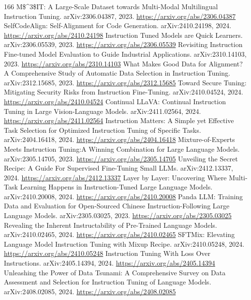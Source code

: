 \documentclass[11pt]{article}
\begin{document}
\begin{thebibliography}{166}
 M\$\textasciicircum{}3\$IT: A Large-Scale Dataset towards Multi-Modal Multilingual Instruction Tuning. arXiv:2306.04387, 2023. \url{https://arxiv.org/abs/2306.04387}
 SelfCodeAlign: Self-Alignment for Code Generation. arXiv:2410.24198, 2024. \url{https://arxiv.org/abs/2410.24198}
 Instruction Tuned Models are Quick Learners. arXiv:2306.05539, 2023. \url{https://arxiv.org/abs/2306.05539}
 Revisiting Instruction Fine-tuned Model Evaluation to Guide Industrial Applications. arXiv:2310.14103, 2023. \url{https://arxiv.org/abs/2310.14103}
 What Makes Good Data for Alignment? A Comprehensive Study of Automatic Data Selection in Instruction Tuning. arXiv:2312.15685, 2023. \url{https://arxiv.org/abs/2312.15685}
 Toward Secure Tuning: Mitigating Security Risks from Instruction Fine-Tuning. arXiv:2410.04524, 2024. \url{https://arxiv.org/abs/2410.04524}
 Continual LLaVA: Continual Instruction Tuning in Large Vision-Language Models. arXiv:2411.02564, 2024. \url{https://arxiv.org/abs/2411.02564}
 Instruction Matters: A Simple yet Effective Task Selection for Optimized Instruction Tuning of Specific Tasks. arXiv:2404.16418, 2024. \url{https://arxiv.org/abs/2404.16418}
 Mixture-of-Experts Meets Instruction Tuning:A Winning Combination for Large Language Models. arXiv:2305.14705, 2023. \url{https://arxiv.org/abs/2305.14705}
 Unveiling the Secret Recipe: A Guide For Supervised Fine-Tuning Small LLMs. arXiv:2412.13337, 2024. \url{https://arxiv.org/abs/2412.13337}
 Layer by Layer: Uncovering Where Multi-Task Learning Happens in Instruction-Tuned Large Language Models. arXiv:2410.20008, 2024. \url{https://arxiv.org/abs/2410.20008}
 Panda LLM: Training Data and Evaluation for Open-Sourced Chinese Instruction-Following Large Language Models. arXiv:2305.03025, 2023. \url{https://arxiv.org/abs/2305.03025}
 Revealing the Inherent Instructability of Pre-Trained Language Models. arXiv:2410.02465, 2024. \url{https://arxiv.org/abs/2410.02465}
 SFTMix: Elevating Language Model Instruction Tuning with Mixup Recipe. arXiv:2410.05248, 2024. \url{https://arxiv.org/abs/2410.05248}
 Instruction Tuning With Loss Over Instructions. arXiv:2405.14394, 2024. \url{https://arxiv.org/abs/2405.14394}
 Unleashing the Power of Data Tsunami: A Comprehensive Survey on Data Assessment and Selection for Instruction Tuning of Language Models. arXiv:2408.02085, 2024. \url{https://arxiv.org/abs/2408.02085}

\end{thebibliography}
\end{document}

